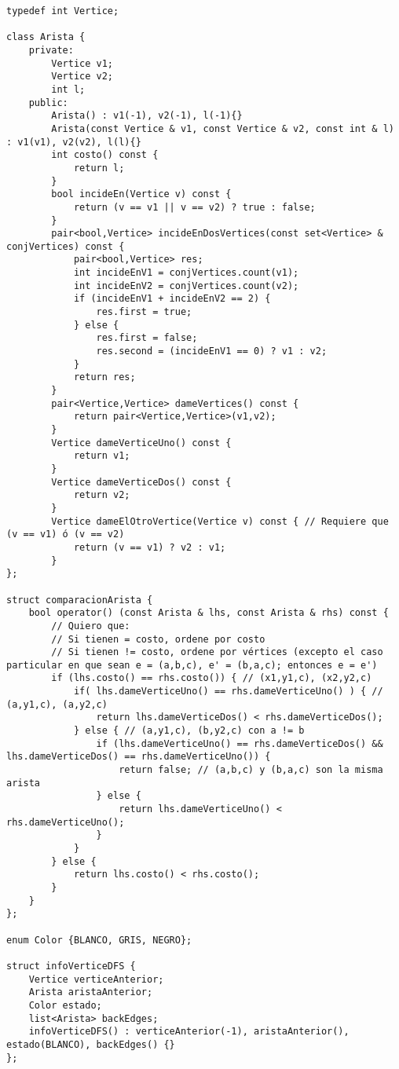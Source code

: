 \begin{lstlisting}[frame=single]
typedef int Vertice;

class Arista {
    private:
        Vertice v1;
        Vertice v2;
        int l;
    public:
        Arista() : v1(-1), v2(-1), l(-1){}
        Arista(const Vertice & v1, const Vertice & v2, const int & l) : v1(v1), v2(v2), l(l){}
        int costo() const {
            return l;
        }
        bool incideEn(Vertice v) const {
            return (v == v1 || v == v2) ? true : false;
        }
        pair<bool,Vertice> incideEnDosVertices(const set<Vertice> & conjVertices) const {
            pair<bool,Vertice> res;
            int incideEnV1 = conjVertices.count(v1);
            int incideEnV2 = conjVertices.count(v2);
            if (incideEnV1 + incideEnV2 == 2) {
                res.first = true;
            } else {
                res.first = false;
                res.second = (incideEnV1 == 0) ? v1 : v2;
            }
            return res;
        }
        pair<Vertice,Vertice> dameVertices() const {
            return pair<Vertice,Vertice>(v1,v2);
        }
        Vertice dameVerticeUno() const {
            return v1;
        }
        Vertice dameVerticeDos() const {
            return v2;
        }
        Vertice dameElOtroVertice(Vertice v) const { // Requiere que (v == v1) ó (v == v2)
            return (v == v1) ? v2 : v1;
        }
};

struct comparacionArista {
    bool operator() (const Arista & lhs, const Arista & rhs) const {
        // Quiero que:
        // Si tienen = costo, ordene por costo
        // Si tienen != costo, ordene por vértices (excepto el caso particular en que sean e = (a,b,c), e' = (b,a,c); entonces e = e')
        if (lhs.costo() == rhs.costo()) { // (x1,y1,c), (x2,y2,c)
            if( lhs.dameVerticeUno() == rhs.dameVerticeUno() ) { // (a,y1,c), (a,y2,c)
                return lhs.dameVerticeDos() < rhs.dameVerticeDos();
            } else { // (a,y1,c), (b,y2,c) con a != b
                if (lhs.dameVerticeUno() == rhs.dameVerticeDos() && lhs.dameVerticeDos() == rhs.dameVerticeUno()) {
                    return false; // (a,b,c) y (b,a,c) son la misma arista
                } else {
                    return lhs.dameVerticeUno() < rhs.dameVerticeUno();
                }
            }
        } else {
            return lhs.costo() < rhs.costo();
        }
    }
};

enum Color {BLANCO, GRIS, NEGRO};

struct infoVerticeDFS {
    Vertice verticeAnterior;
    Arista aristaAnterior;
    Color estado;
    list<Arista> backEdges;
    infoVerticeDFS() : verticeAnterior(-1), aristaAnterior(), estado(BLANCO), backEdges() {}
};


\end{lstlisting}
